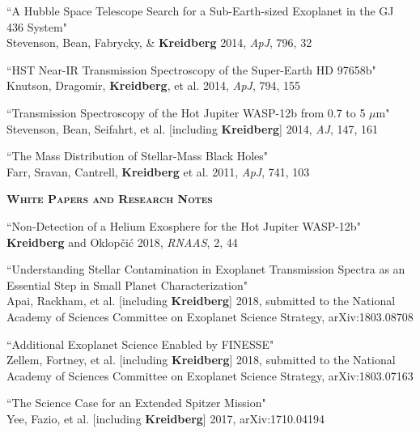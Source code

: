 \documentclass[12pt,letterpaper]{article}
\begin{document}
\begin{compactenum}
\item ``A Hubble Space Telescope Search for a Sub-Earth-sized Exoplanet in the GJ 436 System"\\
Stevenson, Bean, Fabrycky, \& \textbf{Kreidberg} 2014, \textit{ApJ}, 796, 32

\item ``HST Near-IR Transmission Spectroscopy of the Super-Earth HD 97658b"\\
Knutson, Dragomir, \textbf{Kreidberg}, et al. 2014, \textit{ApJ}, 794, 155

\item ``Transmission Spectroscopy of the Hot Jupiter WASP-12b from 0.7 to 5 $\mu$m"\\
Stevenson, Bean, Seifahrt, et al. [including \textbf{Kreidberg}] 2014, \textit{AJ}, 147, 161

\item ``The Mass Distribution of Stellar-Mass Black Holes"\\
Farr, Sravan, Cantrell, \textbf{Kreidberg} et al. 2011, \textit{ApJ}, 741, 103
\end{compactenum}
\vspace{5mm}

\textbf{\textsc{White Papers and Research Notes}} 
\vspace{1mm}
\begin{compactenum}
\item ``Non-Detection of a Helium Exosphere for the Hot Jupiter WASP-12b"\\
\textbf{Kreidberg} and Oklop\v{c}i\'{c} 2018, \textit{RNAAS}, 2, 44

\item ``Understanding Stellar Contamination in Exoplanet Transmission Spectra as an Essential Step in Small Planet Characterization"\\
Apai, Rackham, et al. [including \textbf{Kreidberg}] 2018, submitted to the National Academy of Sciences Committee on Exoplanet Science Strategy, arXiv:1803.08708

\item ``Additional Exoplanet Science Enabled by FINESSE"\\
Zellem, Fortney, et al. [including \textbf{Kreidberg}] 2018, submitted to the
National Academy of Sciences Committee on Exoplanet Science Strategy, arXiv:1803.07163

\item ``The Science Case for an Extended Spitzer Mission"\\
Yee, Fazio, et al. [including \textbf{Kreidberg}] 2017, arXiv:1710.04194
\end{compactenum}
\end{document}
